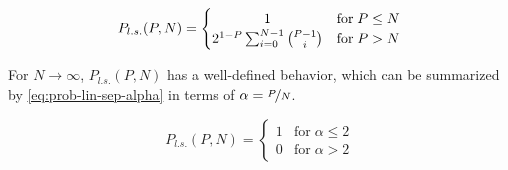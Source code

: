 \begin{equation} \label{eq:prob-lin-sep}
    P_{l.s.}(P,N) = \begin{cases}
        \hfil 1 & \text{for} \; P \leq N\\
        2^{1-P} \sum^{N-1}_{i=0} \binom{P - 1}{i} & \text{for} \; P > N       
    \end{cases}
\end{equation}

For $N \rightarrow \infty$, $P_{l.s.}(P,N)$ has a well-defined behavior, which can be summarized by \cref{eq:prob-lin-sep-alpha} in terms of $\alpha = \nicefrac{P}{N}$.

\begin{equation} \label{eq:prob-lin-sep-alpha}
    P_{l.s.}(P,N) = \begin{cases}
        1 & \text{for} \; \alpha \leq 2\\
        0 & \text{for} \; \alpha > 2
    \end{cases}
\end{equation} 